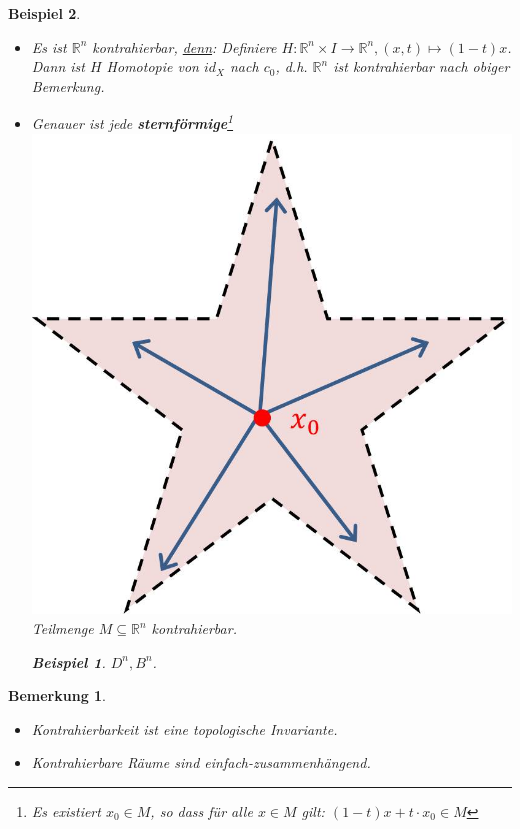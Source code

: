 \documentclass[a4paper,11pt,notitlepage]{report}
\newtheorem{remark}{Bemerkung}[chapter]
\newtheorem{example}{Beispiel}[chapter]
\newcommand{\R}{{\ensuremath{\mathbb{R}}}}
\begin{document}
\begin{example}{}
$ $
\begin{itemize}
	\item Es ist $\R^n$ kontrahierbar, \underline{denn}: \newline
	Definiere $H \colon \R^n \times I \rightarrow \R^n, (x,t) \mapsto (1-t)x$.
	Dann ist $H$ Homotopie von $id_X$ nach $c_0$, d.h. $\R^n$ ist kontrahierbar nach obiger Bemerkung.
	\item Genauer ist jede \textbf{sternförmige}\footnote{Es existiert $x_0 \in M$, so dass für alle $x \in M$ gilt: $(1-t)x + t \cdot x_0 \in M$} \includegraphics[scale=0.3]{images/sternfoermig.jpg} Teilmenge $M \subseteq \R^n$ kontrahierbar.
		\begin{example}
			$D^n, B^n$.
		\end{example}
\end{itemize}
\end{example}

\begin{remark}
	$ $
	\begin{itemize}
		\item Kontrahierbarkeit ist eine topologische Invariante.
		\item Kontrahierbare Räume sind einfach-zusammenhängend.
	\end{itemize}
\end{remark}
\end{document}
